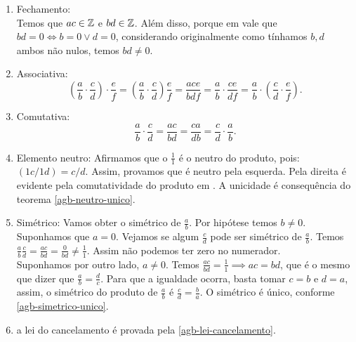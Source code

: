 \documentclass[../main.tex]{subfiles}
\begin{document}
\begin{dem}
    \begin{enumerate}[label=(\roman*)]
        \item Fechamento: \\
        Temos que $ac \in \mathbb{Z}$ e $bd \in \mathbb{Z}$. Além disso, porque em \Z vale que $bd = 0 \iff b = 0 \lor d = 0$, considerando originalmente como tínhamos $b,d$ ambos não nulos, temos $bd \neq 0$.
        
        \item Associativa: \\
            \[
            \left( \frac{a}{b} \cdot \frac{c}{d}\right) \cdot \frac{e}{f} = 
            \left(\frac{a}{b} \cdot \frac{c}{d}\right) \frac{e}{f} = 
            \frac{ace}{bdf} = \frac{a}{b} \cdot \frac{ce}{df} = 
            \frac{a}{b} \cdot \left(\frac{c}{d} \cdot \frac{e}{f}\right)
            .
            \]
            
            
        
        \item Comutativa: \\
        \[ \frac{a}{b} \cdot \frac{c}{d} = 
            \frac{ac}{bd} = 
            \frac{ca}{db} = 
            \frac{c}{d} \cdot \frac{a}{b} . \]
            
        
        \item Elemento neutro: Afirmamos que o $\frac{1}{1}$ é o neutro do produto, pois: $\left(1c/1d \right) = c/d$.
        Assim, provamos que é neutro pela esquerda. Pela direita é evidente pela comutatividade do produto em \Z. A unicidade é consequência do teorema \cref{agb-neutro-unico}.
        
        \item Simétrico: Vamos obter o simétrico de $\frac{a}{b}$. Por hipótese temos $b \neq 0$. Suponhamos que $a=0$. Vejamos se algum $\frac{c}{d}$
        pode ser simétrico de $\frac{a}{b}$. Temos $\frac{a}{b} \frac{c}{d} = \frac{ac}{bd} = \frac{0}{bd} \neq \frac{1}{1}$. Assim não podemos ter zero no numerador. \\
        Suponhamos por outro lado, $a \neq 0$. Temos $\frac{ac}{bd} = \frac{1}{1} \implies ac = bd$, que é o mesmo que dizer que $\frac{a}{b} = \frac{d}{c}$. Para que a igualdade ocorra, basta tomar $c=b$ e $d=a$, assim, o simétrico do produto de $\frac{a}{b}$ é $\frac{c}{d} = \frac{b}{a}$. O simétrico é único, conforme \cref{agb-simetrico-unico}.
        
        \item a lei do cancelamento é provada pela \cref{agb-lei-cancelamento}.

    \end{enumerate}    
\end{dem}
\end{document}
